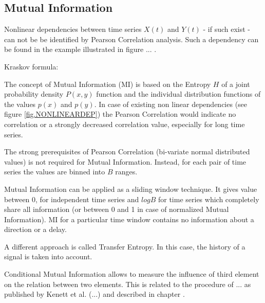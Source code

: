 \documentclass[a4paper,10pt]{scrbook}
\begin{document}
\clearpage
\newpage

\subsection{Mutual Information}
Nonlinear dependencies between time series $X(t)$ and $Y(t)$ - if such exist - can not be be identified by Pearson Correlation analysis. Such a dependency can be found in the example illustrated in figure ... .

Kraskov formula: 

The concept of Mutual Information (MI) is based on the Entropy $H$ of a joint probability density $P(x,y)$ function and the individual distribution functions of the values $p(x)$ and $p(y)$. In case of existing non linear dependencies (see figure \ref{fig.NONLINEARDEP}) the Pearson Correlation would indicate no correlation or a strongly decreased correlation value, especially for long time series.

The strong prerequisites of Pearson Correlation (bi-variate normal distributed values) is not required for Mutual Information. Instead, for each pair of time series the values are binned into $B$ ranges.

Mutual Information can be applied as a sliding  window technique. It gives value between 0, for independent time series and $log B$ for time series which completely share all information (or between 0 and 1 in case of normalized Mutual Information). MI for a particular time window contains no information about a direction or a delay. 

A different approach is called Transfer Entropy. In this case, the history of a signal is taken into account. 

Conditional Mutual Information allows to measure the influence of third element on the relation between two elements. This is related to the procedure of ... as published by Kenett et al. (...) and described in chapter \label{adopt.ICF}.  

\label{ext.fig.NONLINEARDEP} 

\end{document}
